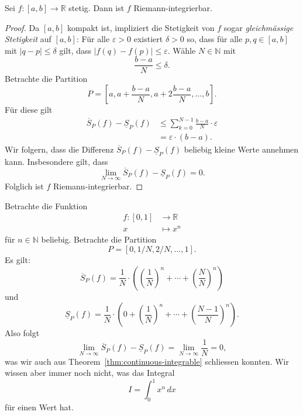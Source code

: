 \documentclass[../main.tex]{subfiles}
\begin{document}
\begin{theorem}\label{thm:continuous-integrable}
  Sei $f \colon [a, b] \to \mathbb{R}$ stetig. Dann ist $f$ 
  Riemann-integrierbar.
\end{theorem}

\begin{proof}
  Da $[a, b]$ kompakt ist, impliziert die Stetigkeit von $f$ sogar
  \emph{gleichmässige Stetigkeit} auf $[a, b]$:
  Für alle $\varepsilon > 0$ existiert $\delta > 0$ so, dass
  für alle $p, q \in [a, b]$ mit $|q - p| \leq \delta$ gilt, dass
  $|f(q) - f(p)| \leq \varepsilon$.
  Wähle $N \in \mathbb{N}$ mit
  \[
    \frac{b-a}{N} \leq \delta.
  \]
  Betrachte die Partition
   \[
    P = \left[ a, a + \frac{b - a}{N}, a + 2 \frac{b-a}{N}, \dots,
    b\right].
  \]
  Für diese gilt
  \begin{align*}
    \overline S_P(f) - \underline S_P(f)
    &\leq \sum_{k=0}^{N-1} \frac{b-a}{N}\cdot \varepsilon  \\
    &= \varepsilon \cdot (b-a).
  \end{align*}
  Wir folgern, dass die Differenz $\overline S_P(f) - \underline S_P(f)$ 
  beliebig kleine Werte annehmen kann. Insbesondere gilt,
  dass
  \[
    \lim_{N \to \infty} \overline S_P(f) - \underline S_P(f) = 0.
  \]
  Folglich ist $f$ Riemann-integrierbar.
\end{proof}

\begin{example}
  Betrachte die Funktion
  \begin{align*}
    f \colon [0, 1] & \to \mathbb{R} \\
    x & \mapsto x^n
  \end{align*}
  für $n \in \mathbb{N}$ beliebig. Betrachte die
  Partition
  \[
    P = [0, 1/N, 2/N, \dots, 1].
  \]
  Es gilt:
  \[
    \overline S_P(f) = \frac{1}{N} \cdot \left( {\left( \frac{1}{N}  \right)}^n
    + \cdots + {\left( \frac{N}{N}  \right)}^n \right)
  \]
  und
  \[
    \underline S_P(f) = \frac{1}{N} \cdot \left( 0 +{\left( \frac{1}{N}  \right)}^n 
    + \cdots + {\left( \frac{N-1}{N}  \right)}^n\right).
  \]
  Also folgt
  \[
    \lim_{N \to \infty} \overline S_P(f) - \underline S_P(f) = 
    \lim_{N \to \infty}\frac{1}{N} = 0,
  \]
  was wir auch aus Theorem~\ref{thm:continuous-integrable} schliessen konnten.
  Wir wissen aber immer noch nicht, was das Integral
  \[
    I = \int_{0}^{1} x^n \, dx
  \]
  für einen Wert hat.
\end{example}
\end{document}

